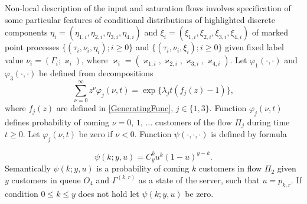 \documentclass[10pt]{article}
\begin{document}
Non-local description of the input and saturation flows involves specification of some particular features of conditional distributions of highlighted discrete components $\eta_i=(\eta_{1,i},\eta_{2,i}, \eta_{3,i}, \eta_{4,i})$ and $\xi_i=(\xi_{1,i}, \xi_{2,i}, \xi_{3,i}, \xi_{4,i})$ of marked point processes $\{(\tau_i, \nu_i, \eta_i); i\geqslant 0\}$ and $\{(\tau_i, \nu_i, \xi_i); i\geqslant 0\}$ given fixed label value $\nu_i = (\Gamma_i;\varkappa_i)$, where $\varkappa_i=(\varkappa_{1,i},\varkappa_{2,i},\varkappa_{3,i},\varkappa_{4,i})$. 
Let $\varphi_1(\cdot,\cdot)$ and $\varphi_3(\cdot,\cdot)$ be defined from decompositions 
\begin{equation*}
\sum_{\nu=0}^{\infty} z^\nu\varphi_j(\nu,t) = \exp\{\lambda_j t (f_j(z)-1)\},
\end{equation*}
where $f_j(z)$ are defined in \eqref{GeneratingFunc}, $j \in \{1,3\}$. Function $\varphi_j(\nu,t)$ defines probability of coming $\nu=0$, $1$, $\ldots$ customers of the flow $\Pi_j$ during time $t \geqslant 0$. Let $\varphi_j(\nu,t)$ be zero if $\nu < 0$. Function $\psi(\cdot,\cdot,\cdot)$ is defined by formula

\begin{equation*}
\psi(k;y,u)=C_y^k u^k (1-u)^{y-k}.	
\end{equation*}
Semantically $\psi(k;y,u)$ is a probability of coming $k$ customers in flow $\Pi_2$ given $y$ customers in queue $O_4$ and $\Gamma^{(k,r)}$ as a state of the server, such that $u=p_{k,r}$. If condition $ 0\leqslant k \leqslant y$ does not hold let $\psi(k;y,u)$ be zero.
\end{document}
